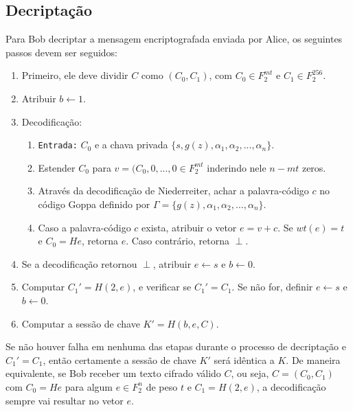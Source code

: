 \subsection{Decriptação}

Para Bob decriptar a mensagem encriptografada enviada por Alice, os seguintes passos devem ser seguidos:

\begin{enumerate}
    \item Primeiro, ele deve dividir $C$ como $(C_0, C_1)$, com $C_0 \in {F}_{2}^{mt}$ e $C_1 \in {F}_{2}^{256}$.
    
    \item Atribuir $b \leftarrow 1$.
    
    \item Decodificação:
        \begin{enumerate}
            \item \texttt{Entrada:} $C_0$ e a chava privada $\{s, g(z), \alpha_1, \alpha_2, ..., \alpha_n\}$.
            \item Estender $C_0$ para $v = (C_0, 0, ..., 0 \in  {F}_{2}^{mt}$ inderindo nele $n - mt$ zeros.
            \item Através da decodificação de Niederreiter, achar a palavra-código $c$ no código Goppa definido por $\Gamma = \{g(z), \alpha_1, \alpha_2, ..., \alpha_n\}$.
            \item Caso a palavra-código $c$ exista, atribuir o vetor $e = v + c$. Se $wt(e) = t$ e $C_0 = He$, retorna $e$. Caso contrário, retorna $\perp$.
        \end{enumerate}
    
    \item Se a decodificação retornou $\perp$, atribuir $e \leftarrow s$ e $b \leftarrow 0$.
    
    \item Computar $C_1' = H(2, e)$, e verificar se $C_1' = C_1$. Se não for, definir $e \leftarrow s$ e $b \leftarrow 0$.
    
    \item Computar a sessão de chave $K' = H(b, e, C)$.
\end{enumerate}

Se não houver falha em nenhuma das etapas durante o processo de decriptação e $C_1' = C_1$, então certamente a sessão de chave $K'$ será idêntica a $K$. De maneira equivalente, se Bob receber um texto cifrado válido $C$, ou seja, $C = (C_0, C_1)$ com $C_0 = He$ para algum $e \in {F}_{2}^{n}$ de peso $t$ e $C_1 = H(2, e)$, a decodificação sempre vai resultar no vetor $e$.

